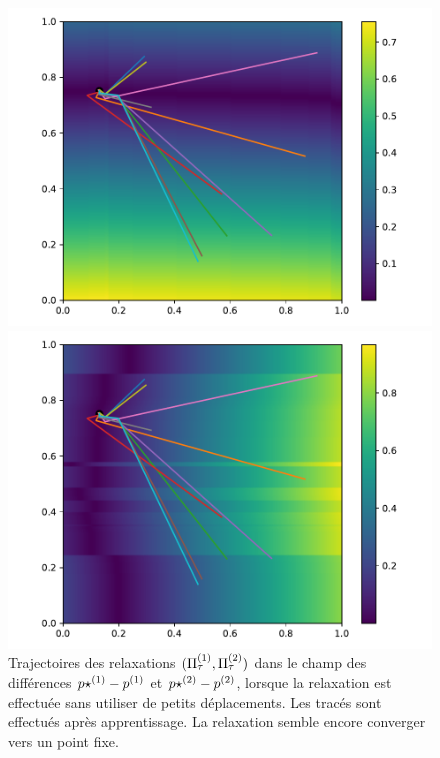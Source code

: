 \begin{figure}
\begin{minipage}{0.5\textwidth}
\includegraphics[width=\textwidth]{champ_X_009}
\end{minipage}
\begin{minipage}{0.5\textwidth}
\includegraphics[width=\textwidth]{champ_Y_009}
\end{minipage}
\caption{Trajectoires des relaxations $(\Pi^{({1})}_{\tau},\Pi^{({2})}_\tau)$ dans le champ des différences ${p\star}^{({1})} - p^{({1})}$ et ${p\star}^{({2})} - p^{({2})}$, lorsque la relaxation est effectuée sans utiliser de petits déplacements. Les tracés sont effectués après apprentissage. La relaxation semble encore converger vers un point fixe.}
\label{fig:diff_nopas}
\end{figure}

